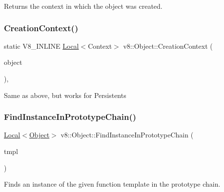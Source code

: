 Returns the context in which the object was created. \mbox{\label{classv8_1_1Object_ae958203f358c7af3727ef7179790d01f}} 
\subsubsection{\texorpdfstring{Creation\+Context()}{CreationContext()}\hspace{0.1cm}{\footnotesize\ttfamily [2/2]}}
{\footnotesize\ttfamily static V8\+\_\+\+I\+N\+L\+I\+NE \mbox{\hyperlink{classv8_1_1Local}{Local}}$<$Context$>$ v8\+::\+Object\+::\+Creation\+Context (\begin{DoxyParamCaption}\item[{const \mbox{\hyperlink{classv8_1_1PersistentBase}{Persistent\+Base}}$<$ \mbox{\hyperlink{classv8_1_1Object}{Object}} $>$ \&}]{object }\end{DoxyParamCaption})\hspace{0.3cm}{\ttfamily [inline]}, {\ttfamily [static]}}

Same as above, but works for Persistents \mbox{\label{classv8_1_1Object_ae2ad9fee9db6e0e5da56973ebb8ea2bc}} 
\subsubsection{\texorpdfstring{Find\+Instance\+In\+Prototype\+Chain()}{FindInstanceInPrototypeChain()}}
{\footnotesize\ttfamily \mbox{\hyperlink{classv8_1_1Local}{Local}}$<$\mbox{\hyperlink{classv8_1_1Object}{Object}}$>$ v8\+::\+Object\+::\+Find\+Instance\+In\+Prototype\+Chain (\begin{DoxyParamCaption}\item[{\mbox{\hyperlink{classv8_1_1Local}{Local}}$<$ \mbox{\hyperlink{classv8_1_1FunctionTemplate}{Function\+Template}} $>$}]{tmpl }\end{DoxyParamCaption})}

Finds an instance of the given function template in the prototype chain. \mbox{\label{classv8_1_1Object_a435f68bb7ef0f64dd522c5c910682448}} 
